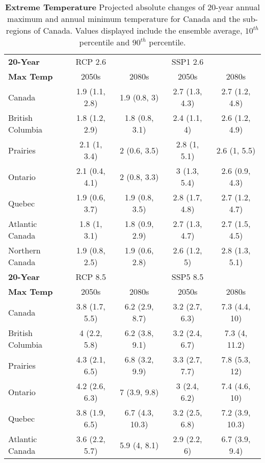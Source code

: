 \documentclass[]{scrartcl}
\begin{document}
\begin{table}[t]
	\caption{\textbf{Extreme Temperature} Projected absolute changes of 20-year annual maximum and annual minimum temperature for Canada and the sub-regions of Canada. Values displayed include the ensemble average, $10^{th}$ percentile and $90^{th}$ percentile.}\label{table:bc_rp20_tas}
	\begin{center}
		\begin{tabularx}{\linewidth}{|L|cc|cc|} 
			\hline
			\textbf{20-Year} & RCP 2.6 & & SSP1 2.6 &   \\
			\textbf{Max Temp}                & 2050s & 2080s & 2050s &2080s \\
			\hline
			Canada & 1.9 (1.1, 2.8) & 1.9 (0.8, 3) & 2.7 (1.3, 4.3) & 2.7 (1.2, 4.8) \\ 
			British Columbia & 1.8 (1.2, 2.9) & 1.8 (0.8, 3.1) & 2.4 (1.1, 4) & 2.6 (1.2, 4.9) \\ 
			Prairies & 2.1 (1, 3.4) & 2 (0.6, 3.5) & 2.8 (1, 5.1) & 2.6 (1, 5.5) \\ 
			Ontario & 2.1 (0.4, 4.1) & 2 (0.8, 3.3) & 3 (1.3, 5.4) & 2.6 (0.9, 4.3) \\ 
			Quebec & 1.9 (0.6, 3.7) & 1.9 (0.8, 3.5) & 2.8 (1.7, 4.8) & 2.7 (1.2, 4.7) \\ 
			Atlantic Canada & 1.8 (1, 3.1) & 1.8 (0.9, 2.9) & 2.7 (1.3, 4.7) & 2.7 (1.5, 4.5) \\ 
			Northern Canada & 1.9 (0.8, 2.5) & 1.9 (0.6, 2.8) & 2.6 (1.2, 5) & 2.8 (1.3, 5.1) \\ 
			\hline
			\textbf{20-Year} & RCP 8.5 & & SSP5 8.5 &   \\
			\textbf{Max Temp}			& 2050s & 2080s & 2050s &2080s \\
			\hline
			Canada & 3.8 (1.7, 5.5) & 6.2 (2.9, 8.7) & 3.2 (2.7, 6.3) & 7.3 (4.4, 10) \\ 
			British Columbia & 4 (2.2, 5.8) & 6.2 (3.8, 9.1) & 3.2 (2.4, 6.7) & 7.3 (4, 11.2) \\ 
			Prairies & 4.3 (2.1, 6.5) & 6.8 (3.2, 9.9) & 3.3 (2.7, 7.7) & 7.8 (5.3, 12) \\ 
			Ontario & 4.2 (2.6, 6.3) & 7 (3.9, 9.8) & 3 (2.4, 6.2) & 7.4 (4.6, 10) \\ 
			Quebec & 3.8 (1.9, 6.5) & 6.7 (4.3, 10.3) & 3.2 (2.5, 6.8) & 7.2 (3.9, 10.3) \\ 
			Atlantic Canada & 3.6 (2.2, 5.7) & 5.9 (4, 8.1) & 2.9 (2.2, 6) & 6.7 (3.9, 9.4) \\ 

\end{tabularx}
\end{center}
\end{table}
\end{document}
